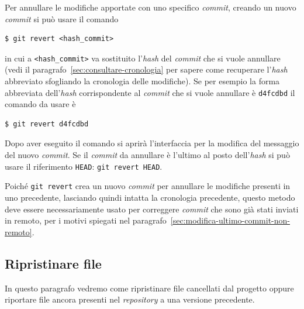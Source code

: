 \documentclass[a4paper,12pt,oneside]{article}
\begin{document}
Per annullare le modifiche apportate con uno specifico \emph{commit}, creando un
nuovo \emph{commit} si può usare il comando
\begin{lstlisting}
$ git revert <hash_commit>
\end{lstlisting}
in cui a \lstinline|<hash_commit>| va sostituito l'\emph{hash} del \emph{commit}
che si vuole annullare (vedi il paragrafo~\ref{sec:consultare-cronologia} per
sapere come recuperare l'\emph{hash} abbreviato sfogliando la cronologia delle
modifiche). Se per esempio la forma abbreviata dell'\emph{hash} corrispondente
al \emph{commit} che si vuole annullare è \lstinline|d4fcdbd| il comando da
usare è
\begin{lstlisting}
$ git revert d4fcdbd
\end{lstlisting}
Dopo aver eseguito il comando si aprirà l'interfaccia per la modifica del
messaggio del nuovo \emph{commit}. Se il \emph{commit} da annullare è l'ultimo
al posto dell'\emph{hash} si può usare il riferimento \lstinline|HEAD|:
\lstinline|git revert HEAD|.

Poiché \lstinline|git revert| crea un nuovo \emph{commit} per annullare le
modifiche presenti in uno precedente, lasciando quindi intatta la cronologia
precedente, questo metodo deve essere necessariamente usato per correggere
\emph{commit} che sono già stati inviati in remoto, per i motivi spiegati nel
paragrafo~\ref{sec:modifica-ultimo-commit-non-remoto}.

\subsection{Ripristinare file}
\label{sec:ripristinare-file}

In questo paragrafo vedremo come ripristinare file cancellati dal progetto
oppure riportare file ancora presenti nel \emph{repository} a una versione
precedente.
\end{document}
